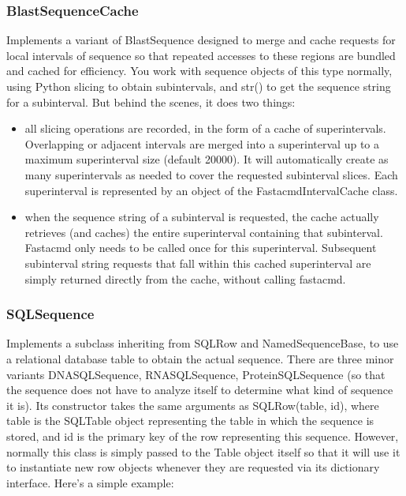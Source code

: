 \documentclass{howto}
\begin{document}
\subsubsection{BlastSequenceCache}

Implements a variant of BlastSequence designed to merge and cache requests for local intervals of sequence so that repeated accesses to these regions are bundled and cached for efficiency.  You work with sequence objects of this type normally, using Python slicing to obtain subintervals, and str() to get the sequence string for a subinterval.  But behind the scenes, it does two things:

\begin{itemize}
\item
all slicing operations are recorded, in the form of a cache of superintervals.  Overlapping or adjacent intervals are merged into a superinterval up to a maximum superinterval size (default 20000).  It will automatically create as many superintervals as needed to cover the requested subinterval slices.  Each superinterval is represented by an object of the FastacmdIntervalCache class.

\item 
when the sequence string of a subinterval is requested, the cache actually retrieves (and caches) the entire superinterval containing that subinterval.  Fastacmd only needs to be called once for this superinterval.  Subsequent subinterval string requests that fall within this cached superinterval are simply returned directly from the cache, without calling fastacmd.

\end{itemize}

\subsubsection{SQLSequence}

Implements a subclass inheriting from SQLRow and NamedSequenceBase, to use a relational database table to obtain the actual sequence.  There are three minor variants DNASQLSequence, RNASQLSequence, ProteinSQLSequence (so that the sequence does not have to analyze itself to determine what kind of sequence it is).  Its constructor takes the same arguments as SQLRow(table, id), where table is the SQLTable object representing the table in which the sequence is stored, and id is the primary key of the row representing this sequence.  However, normally this class is simply passed to the Table object itself so that it will use it to instantiate new row objects whenever they are requested via its dictionary interface.  Here's a simple example:
\end{document}
